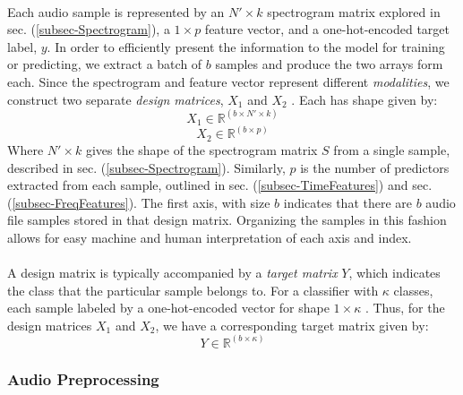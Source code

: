 \documentclass[12pt,letterpaper]{article}
\begin{document}
\paragraph*{}Each audio sample is represented by an $N' \times k$ spectrogram matrix explored in sec. (\ref{subsec-Spectrogram}), a $1 \times p$ feature vector, and a  one-hot-encoded target label, $y$. In order to efficiently present the information to the model for training or predicting, we extract a batch of $b$ samples and produce the two arrays form each. Since the spectrogram and feature vector represent different \textit{modalities}, we construct two separate \textit{design matrices}, $X_1$ and $X_2$ \cite{Geron,Li,Ngiam}. Each has shape given by:
\begin{equation}
\label{eqn-X1Shape}
X_1 \in \mathbb{R}^{(b \times N' \times k)}
\end{equation}
\begin{equation}
\label{eqn-X2Shape}
X_2 \in \mathbb{R}^{(b \times p)}
\end{equation}
Where $N' \times k$ gives the shape of the spectrogram matrix $S$ from a single sample, described in sec. (\ref{subsec-Spectrogram}). Similarly, $p$ is the number of predictors extracted from each sample, outlined in sec. (\ref{subsec-TimeFeatures}) and sec.(\ref{subsec-FreqFeatures}). The first axis, with size $b$ indicates that there are $b$ audio file samples stored in that design matrix. Organizing the samples in this fashion allows for easy machine and human interpretation of each axis and index.

\paragraph*{}A design matrix is typically accompanied by a \textit{target matrix} $Y$, which indicates the class that the particular sample belongs to. For a classifier with $\kappa$ classes, each sample labeled by a one-hot-encoded vector for shape $1 \times \kappa$ \cite{Tensorflow,Loy}. Thus, for the design matrices $X_1$ and $X_2$, we have a corresponding target matrix given by:
\begin{equation}
\label{eqn-YShape}
Y \in \mathbb{R}^{(b \times \kappa)}
\end{equation}


\subsubsection{Audio Preprocessing}
\label{subsubsec-Preprocessing}
\end{document}
